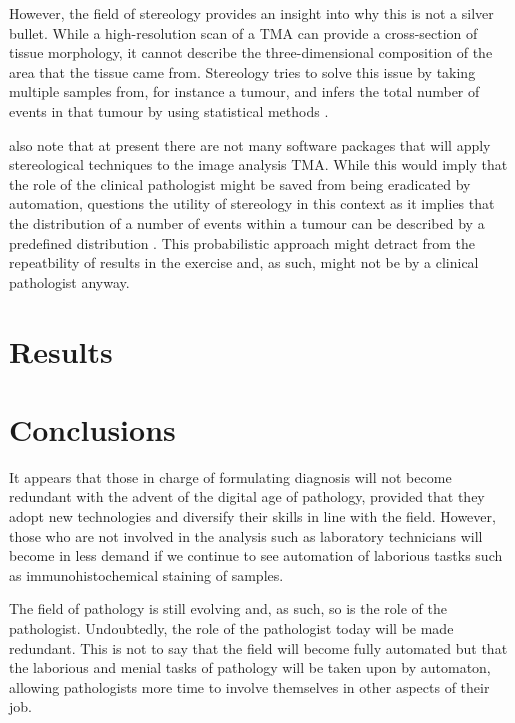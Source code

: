 \documentclass[12pt]{article}
\begin{document}
However, the field of stereology provides an insight into why this is not a silver bullet. While a high-resolution 
scan of a TMA can provide a cross-section of tissue morphology, it cannot describe the three-dimensional 
composition of the area that the tissue came from. Stereology tries to solve this issue by taking multiple samples 
from, for instance a tumour, and infers the total number of events in that tumour by using statistical methods 
\parencite{webster2014whole}.

\citeauthor{webster2014whole} also note that at present there are not many software packages that will apply 
stereological techniques to the image analysis TMA. While this would imply that the role of the clinical pathologist 
might be saved from being eradicated by automation, \citeauthor{suvarna2013bancroft} questions the utility of 
stereology in this context as it implies that the distribution of a number of events within a tumour can be described 
by a predefined distribution \parencite[p.~540, Ch.~23.]{suvarna2013bancroft}. This probabilistic approach might 
detract from the repeatbility of results in the exercise and, as such, might not be by a clinical pathologist anyway.

\section{Results}\label{results}

\section{Conclusions}\label{conclusions}

It appears that those in charge of formulating diagnosis will not become redundant with the advent of the digital age 
of pathology, provided that they adopt new technologies and diversify their skills in line with the field. However, those 
who are not involved in the analysis such as laboratory technicians will become in less demand if we continue to see 
automation of laborious tastks such as immunohistochemical staining of samples.

The field of pathology is still evolving and, as such, so is the role of the pathologist. Undoubtedly, the role of the 
pathologist today will be made redundant. This is not to say that the field will become fully automated but that the 
laborious and menial tasks of pathology will be taken upon by automaton, allowing pathologists more time to involve 
themselves in other aspects of their job.

\printbibliography
\end{document}
